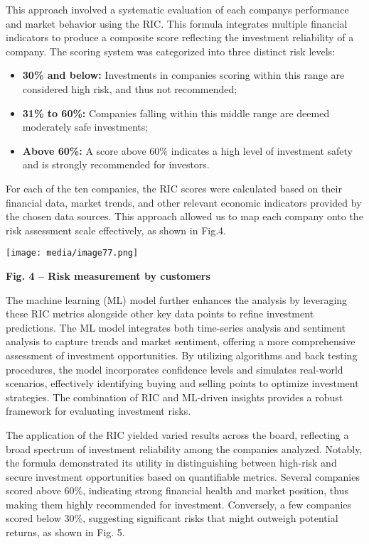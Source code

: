 \documentclass[
]{article}
\begin{document}
This approach involved a systematic evaluation of each
company\textquotesingle s performance and market behavior using the RIC.
This formula integrates multiple financial indicators to produce a
composite score reflecting the investment reliability of a company. The
scoring system was categorized into three distinct risk levels:

\begin{itemize}
\item
  \textbf{30\% and below:} Investments in companies scoring within this
  range are considered high risk, and thus not recommended;
\item
  \textbf{31\% to 60\%:} Companies falling within this middle range are
  deemed moderately safe investments;
\item
  \textbf{Above 60\%:} A score above 60\% indicates a high level of
  investment safety and is strongly recommended for investors.
\end{itemize}

For each of the ten companies, the RIC scores were calculated based on
their financial data, market trends, and other relevant economic
indicators provided by the chosen data sources. This approach allowed us
to map each company onto the risk assessment scale effectively, as shown
in Fig.4.

\texttt{[image: media/image77.png]}

\textbf{Fig. 4 -- Risk measurement by customers}

The machine learning (ML) model further enhances the analysis by
leveraging these RIC metrics alongside other key data points to refine
investment predictions. The ML model integrates both time-series
analysis and sentiment analysis to capture trends and market sentiment,
offering a more comprehensive assessment of investment opportunities. By
utilizing algorithms and back testing procedures, the model incorporates
confidence levels and simulates real-world scenarios, effectively
identifying buying and selling points to optimize investment strategies.
The combination of RIC and ML-driven insights provides a robust
framework for evaluating investment risks.

The application of the RIC yielded varied results across the board,
reflecting a broad spectrum of investment reliability among the
companies analyzed. Notably, the formula demonstrated its utility in
distinguishing between high-risk and secure investment opportunities
based on quantifiable metrics. Several companies scored above 60\%,
indicating strong financial health and market position, thus making them
highly recommended for investment. Conversely, a few companies scored
below 30\%, suggesting significant risks that might outweigh potential
returns, as shown in Fig. 5.
\end{document}

